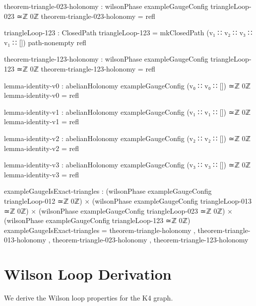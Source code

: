 \documentclass[11pt,a4paper]{book}
\begin{document}
\begin{code}
theorem-triangle-023-holonomy : wilsonPhase exampleGaugeConfig triangleLoop-023 ≃ℤ 0ℤ
theorem-triangle-023-holonomy = refl

triangleLoop-123 : ClosedPath
triangleLoop-123 = mkClosedPath 
  (v₁ ∷ v₂ ∷ v₃ ∷ v₁ ∷ [])
  path-nonempty
  refl

theorem-triangle-123-holonomy : wilsonPhase exampleGaugeConfig triangleLoop-123 ≃ℤ 0ℤ
theorem-triangle-123-holonomy = refl

lemma-identity-v0 : abelianHolonomy exampleGaugeConfig (v₀ ∷ v₀ ∷ []) ≃ℤ 0ℤ
lemma-identity-v0 = refl

lemma-identity-v1 : abelianHolonomy exampleGaugeConfig (v₁ ∷ v₁ ∷ []) ≃ℤ 0ℤ
lemma-identity-v1 = refl

lemma-identity-v2 : abelianHolonomy exampleGaugeConfig (v₂ ∷ v₂ ∷ []) ≃ℤ 0ℤ
lemma-identity-v2 = refl

lemma-identity-v3 : abelianHolonomy exampleGaugeConfig (v₃ ∷ v₃ ∷ []) ≃ℤ 0ℤ
lemma-identity-v3 = refl

exampleGaugeIsExact-triangles : 
  (wilsonPhase exampleGaugeConfig triangleLoop-012 ≃ℤ 0ℤ) ×
  (wilsonPhase exampleGaugeConfig triangleLoop-013 ≃ℤ 0ℤ) ×
  (wilsonPhase exampleGaugeConfig triangleLoop-023 ≃ℤ 0ℤ) ×
  (wilsonPhase exampleGaugeConfig triangleLoop-123 ≃ℤ 0ℤ)
exampleGaugeIsExact-triangles = 
  theorem-triangle-holonomy , 
  theorem-triangle-013-holonomy , 
  theorem-triangle-023-holonomy , 
  theorem-triangle-123-holonomy
\end{code}

\section{Wilson Loop Derivation}

We derive the Wilson loop properties for the K4 graph.
\end{document}
